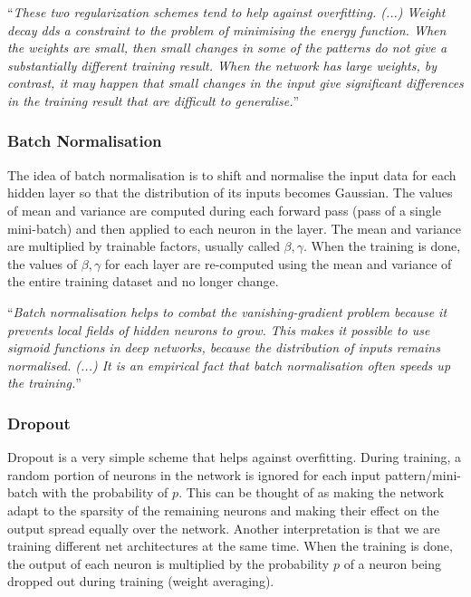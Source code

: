 \enquote{\textit{These two regularization schemes tend to help against overfitting. (...) Weight decay dds a constraint to the problem of minimising the energy function. When the weights are small, then small changes in some of the patterns do not give a substantially different training result. When the network	has large weights, by contrast, it may happen that small changes in the input give	significant differences in the training result that are difficult to generalise.}} \cite{mehlig}

\subsubsection{Batch Normalisation}

The idea of batch normalisation is to shift and normalise the input data for each
hidden layer so that the distribution of its inputs becomes Gaussian. The values of mean and variance are computed during each forward pass (pass of a single mini-batch) and then applied to each neuron in the layer. The mean and variance are multiplied by trainable factors, usually called $ \beta, \gamma $. \cite{stanford-L6} \cite{mehlig} When the training is done, the values of $ \beta, \gamma $ for each layer are re-computed using the mean and variance of the entire training dataset and no longer change. \cite{issue}

\enquote{\textit{Batch normalisation helps to combat the vanishing-gradient problem because it prevents local fields of hidden neurons to grow. This makes it possible to use sigmoid functions in deep networks, because the distribution of inputs remains normalised. (...) It is an empirical fact that batch normalisation often speeds up the training.}} \cite{mehlig}

\subsubsection{Dropout}
\label{dropout_sec}

Dropout is a very simple scheme that helps against overfitting. During training, a random portion of neurons in the network is ignored for each input pattern/mini-batch with the probability of $ p $. This can be thought of as making the network adapt to the sparsity of the remaining neurons and making their effect on the output spread equally over the network. Another interpretation is that we are training different net architectures at the same time. When the training is done, the output of each neuron is multiplied by the probability $ p $ of a neuron being dropped out during training (weight averaging). \cite{mehlig} \cite{stanford-L7}

